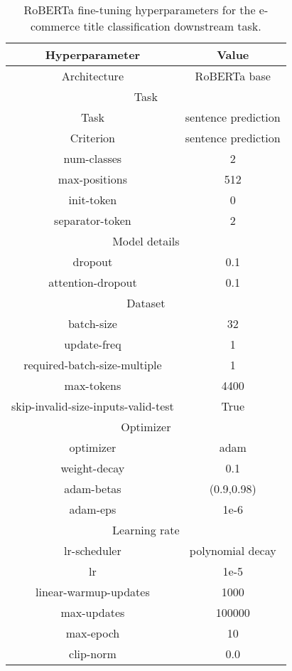 \begin{table}[!h]
	\caption{RoBERTa fine-tuning hyperparameters for the e-commerce title classification downstream task.}
	\label{tab:roberta_finetune_eclassification}
	\begin{center}
		\begin{tabular}{|c|c|}
			\hline
			Hyperparameter\cellcolor[gray]{0.6} & Value \cellcolor[gray]{0.6} \\ \hline
Architecture & RoBERTa base \\ \hline 
\multicolumn{2}{|c|}{\cellcolor[gray]{0.9} Task}\\ \hline 
Task& sentence prediction \\ \hline 
Criterion & sentence prediction \\ \hline 
num-classes & 2 \\ \hline 
max-positions & 512 \\ \hline
init-token & 0  \\ \hline 
separator-token & 2  \\ \hline 
\multicolumn{2}{|c|}{\cellcolor[gray]{0.9} Model details}\\ \hline 
dropout & 0.1 \\ \hline 
attention-dropout & 0.1 \\ \hline 
\multicolumn{2}{|c|}{\cellcolor[gray]{0.9} Dataset}\\ \hline 
batch-size & 32 \\ \hline 
update-freq & 1 \\ \hline 
required-batch-size-multiple & 1 \\ \hline
max-tokens & 4400 \\ \hline
skip-invalid-size-inputs-valid-test & True \\ \hline
\multicolumn{2}{|c|}{\cellcolor[gray]{0.9} Optimizer } \\ \hline 
optimizer &adam \\ \hline 
weight-decay & 0.1 \\ \hline 
adam-betas & (0.9,0.98) \\ \hline 
adam-eps & 1e-6 \\ \hline 
\multicolumn{2}{|c|}{\cellcolor[gray]{0.9} Learning rate} \\ \hline 
lr-scheduler & polynomial decay \\ \hline 
lr & 1e-5 \\ \hline 
linear-warmup-updates & 1000 \\ \hline 
max-updates & 100000 \\ \hline 
max-epoch & 10 \\ \hline
clip-norm & 0.0 \\ \hline 
		\end{tabular}
	\end{center}
\end{table}